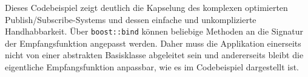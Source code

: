 

Dieses Codebeispiel zeigt deutlich die Kapselung des komplexen optimierten Publish/\-Subscribe-Systems und dessen einfache und unkomplizierte Handhabbarkeit. Über \texttt{boost::bind} können beliebige Methoden an die Signatur der Empfangsfunktion angepasst werden. Daher muss die Applikation einerseits nicht von einer abstrakten Basisklasse abgeleitet sein und andererseits bleibt die eigentliche Empfangsfunktion anpassbar, wie es im Codebeispiel dargestellt ist.

